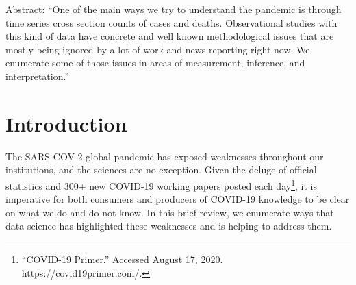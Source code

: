 \documentclass[10pt,letterpaper]{article}
\newcommand{\getIndex}[2]{
  \ForEach{,}{\IfEq{#1}{\thislevelitem}{\number\thislevelcount\ExitForEach}{}}{#2}
}
\newcommand{\getAff}[1]{
  \getIndex{#1}{University of California San Diego}
}
\begin{document}
\vspace*{0.2in}



\linenumbers

Abstract: ``One of the main ways we try to understand the pandemic is
through time series cross section counts of cases and deaths.
Observational studies with this kind of data have concrete and well
known methodological issues that are mostly being ignored by a lot of
work and news reporting right now. We enumerate some of those issues in
areas of measurement, inference, and interpretation.''

\hypertarget{introduction}{%
\section{Introduction}\label{introduction}}

The SARS-COV-2 global pandemic has exposed weaknesses throughout our
institutions, and the sciences are no exception. Given the deluge of
official statistics and 300+ new COVID-19 working papers posted each
day\footnote{``COVID-19 Primer.'' Accessed August 17, 2020.
  https://covid19primer.com/.}, it is imperative for both consumers and
producers of COVID-19 knowledge to be clear on what we do and do not
know. In this brief review, we enumerate ways that data science has
highlighted these weaknesses and is helping to address them.
\end{document}

